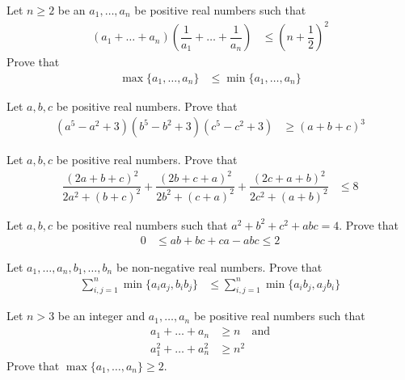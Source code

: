 \documentclass{subfile}
\begin{document}
		\begin{problem}
			Let $n\geq2$ be an $a_{1},\ldots,a_{n}$ be positive real numbers such that
				\begin{align*}
					(a_{1}+\ldots+a_{n})\left(\dfrac{1}{a_{1}}+\ldots+\dfrac{1}{a_{n}}\right)
						& \leq \left(n+\dfrac{1}{2}\right)^{2}
				\end{align*}
			Prove that
				\begin{align*}
					\max\{a_{1},\ldots,a_{n}\}
						& \leq\min\{a_{1},\ldots,a_{n}\}
				\end{align*}
		\end{problem}
	
		\begin{problem}
			Let $a,b,c$ be positive real numbers. Prove that
				\begin{align*}
					(a^{5}-a^{2}+3)(b^{5}-b^{2}+3)(c^{5}-c^{2}+3)
						& \geq (a+b+c)^{3}
				\end{align*}
		\end{problem}
	
		\begin{problem}
			Let $a,b,c$ be positive real numbers. Prove that
				\begin{align*}
					\dfrac{(2a+b+c)^{2}}{2a^{2}+(b+c)^{2}}+\dfrac{(2b+c+a)^{2}}{2b^{2}+(c+a)^{2}}+\dfrac{(2c+a+b)^{2}}{2c^{2}+(a+b)^{2}}
						& \leq 8
				\end{align*}
		\end{problem}
	
		\begin{problem}
			Let $a,b,c$ be positive real numbers such that $a^{2}+b^{2}+c^{2}+abc=4$. Prove that
				\begin{align*}
					0
						& \leq ab+bc+ca-abc\leq 2
				\end{align*}
		\end{problem}
	
		\begin{problem}
			Let $a_{1},\ldots,a_{n},b_{1},\ldots,b_{n}$ be non-negative real numbers. Prove that
				\begin{align*}
					\sum_{i,j=1}^{n}\min\{a_{i}a_{j},b_{i}b_{j}\}
						& \leq\sum_{i,j=1}^{n}\min\{a_{i}b_{j},a_{j}b_{i}\}
				\end{align*}
		\end{problem}
	
		\begin{problem}
			Let $n>3$ be an integer and $a_{1},\ldots,a_{n}$ be positive real numbers such that
				\begin{align*}
					a_{1}+\ldots+a_{n}
						& \geq n\quad\mbox{and}\\
					a_{1}^{2}+\ldots+a_{n}^{2}
						& \geq n^{2}
				\end{align*}
			Prove that $\max\{a_{1},\ldots,a_{n}\}\geq2$.
		\end{problem}
	
\end{document}
